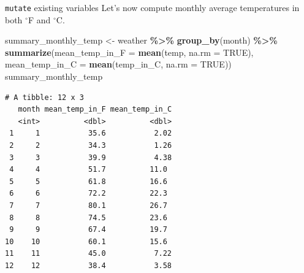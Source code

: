 \documentclass[
  ignorenonframetext,
]{beamer}
\newenvironment{Shaded}{\begin{snugshade}}{\end{snugshade}}
\newcommand{\AttributeTok}[1]{\textcolor[rgb]{0.13,0.29,0.53}{#1}}
\newcommand{\ConstantTok}[1]{\textcolor[rgb]{0.56,0.35,0.01}{#1}}
\newcommand{\FunctionTok}[1]{\textcolor[rgb]{0.13,0.29,0.53}{\textbf{#1}}}
\newcommand{\NormalTok}[1]{#1}
\newcommand{\OtherTok}[1]{\textcolor[rgb]{0.56,0.35,0.01}{#1}}
\newcommand{\SpecialCharTok}[1]{\textcolor[rgb]{0.81,0.36,0.00}{\textbf{#1}}}
\begin{document}
\begin{frame}[fragile]{\texttt{mutate} existing variables}
\protect\hypertarget{mutate-existing-variables-2}{}
Let's now compute monthly average temperatures in both \(^\circ\)F and
\(^\circ\)C.

\tiny

\begin{Shaded}
\begin{Highlighting}[]
\NormalTok{summary\_monthly\_temp }\OtherTok{\textless{}{-}}\NormalTok{ weather }\SpecialCharTok{\%\textgreater{}\%} 
  \FunctionTok{group\_by}\NormalTok{(month) }\SpecialCharTok{\%\textgreater{}\%} 
  \FunctionTok{summarize}\NormalTok{(}\AttributeTok{mean\_temp\_in\_F =} \FunctionTok{mean}\NormalTok{(temp, }\AttributeTok{na.rm =} \ConstantTok{TRUE}\NormalTok{), }
            \AttributeTok{mean\_temp\_in\_C =} \FunctionTok{mean}\NormalTok{(temp\_in\_C, }\AttributeTok{na.rm =} \ConstantTok{TRUE}\NormalTok{))}
\NormalTok{summary\_monthly\_temp}
\end{Highlighting}
\end{Shaded}

\begin{verbatim}
# A tibble: 12 x 3
   month mean_temp_in_F mean_temp_in_C
   <int>          <dbl>          <dbl>
 1     1           35.6           2.02
 2     2           34.3           1.26
 3     3           39.9           4.38
 4     4           51.7          11.0 
 5     5           61.8          16.6 
 6     6           72.2          22.3 
 7     7           80.1          26.7 
 8     8           74.5          23.6 
 9     9           67.4          19.7 
10    10           60.1          15.6 
11    11           45.0           7.22
12    12           38.4           3.58
\end{verbatim}

\normalsize
\end{frame}
\end{document}
